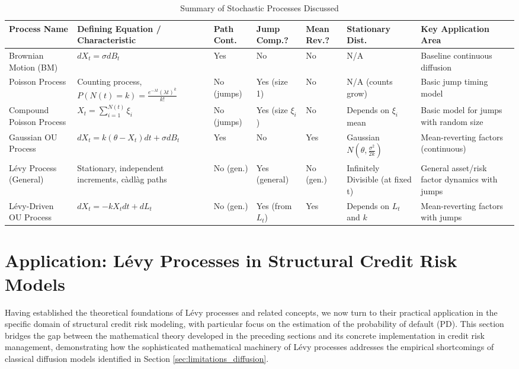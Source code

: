 \documentclass[11pt,twoside,openright]{report}
\begin{document}
\begin{table}[h!]
\scriptsize %
\centering
\caption{Summary of Stochastic Processes Discussed}
\label{tab:process_summary}
\begin{tabular}{@{}p{2.0cm}p{3.0cm}p{1.0cm}p{1.0cm}p{1.0cm}p{2.0cm}p{2.5cm}@{}}
\toprule
Process Name & Defining Equation / Characteristic & Path Cont. & Jump Comp.? & Mean Rev.? & Stationary Dist. & Key Application Area \\
\midrule
Brownian Motion (BM) & $dX_t = \sigma dB_t$ & Yes & No & No & N/A & Baseline continuous diffusion \\
Poisson Process & Counting process, $P(N(t)=k)=\frac{e^{-\lambda t}(\lambda t)^k}{k!}$ & No (jumps) & Yes (size 1) & No & N/A (counts grow) & Basic jump timing model \\
Compound Poisson Process & $X_t = \sum_{i=1}^{N(t)} \xi_i$ & No (jumps) & Yes (size $\xi_i$) & No & Depends on $\xi_i$ mean & Basic model for jumps with random size \\
Gaussian OU Process & $dX_t = k(\theta-X_t)dt + \sigma dB_t$ & Yes & No & Yes & Gaussian $N(\theta,\frac{\sigma^2}{2k})$ & Mean-reverting factors (continuous) \\
Lévy Process (General) & Stationary, independent increments, càdlàg paths & No (gen.) & Yes (general) & No (gen.) & Infinitely Divisible (at fixed t) & General asset/risk factor dynamics with jumps \\
Lévy-Driven OU Process & $dX_t = -k X_t dt + dL_t$ & No (gen.) & Yes (from $L_t$) & Yes & Depends on $L_t$ and $k$ & Mean-reverting factors with jumps \\
\bottomrule
\end{tabular}
\end{table}




\section{Application: Lévy Processes in Structural Credit Risk Models}
\label{sec:application_structural}

Having established the theoretical foundations of Lévy processes and related concepts, we now turn to their practical application in the specific domain of structural credit risk modeling, with particular focus on the estimation of the probability of default (PD). This section bridges the gap between the mathematical theory developed in the preceding sections and its concrete implementation in credit risk management, demonstrating how the sophisticated mathematical machinery of Lévy processes addresses the empirical shortcomings of classical diffusion models identified in Section \ref{sec:limitations_diffusion}.
\end{document}
